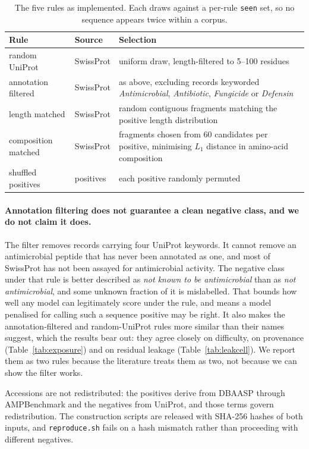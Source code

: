 \documentclass[11pt,a4paper]{article}
\begin{document}
\begin{table}[htbp]\centering\small
\caption{The five rules as implemented. Each draws against a per-rule \texttt{seen} set, so
no sequence appears twice within a corpus.}
\label{tab:negrules}
\begin{tabular}{llp{}}
\toprule
Rule & Source & Selection \\
\midrule
random UniProt      & SwissProt & uniform draw, length-filtered to 5--100 residues \\
annotation filtered & SwissProt & as above, excluding records keyworded
  \textit{Antimicrobial}, \textit{Antibiotic}, \textit{Fungicide} or \textit{Defensin} \\
length matched      & SwissProt & random contiguous fragments matching the positive
  length distribution \\
composition matched & SwissProt & fragments chosen from 60 candidates per positive,
  minimising $L_1$ distance in amino-acid composition \\
shuffled positives  & positives & each positive randomly permuted \\
\bottomrule
\end{tabular}
\end{table}

\paragraph{Annotation filtering does not guarantee a clean negative class, and we do not
claim it does.} The filter removes records carrying four UniProt keywords. It cannot remove
an antimicrobial peptide that has never been annotated as one, and most of SwissProt has
not been assayed for antimicrobial activity. The negative class under that rule is better
described as \emph{not known to be antimicrobial} than as \emph{not antimicrobial}, and
some unknown fraction of it is mislabelled. That bounds how well any model can legitimately
score under the rule, and means a model penalised for calling such a sequence positive may
be right. It also makes the annotation-filtered and random-UniProt rules more similar than
their names suggest, which the results bear out: they agree closely on difficulty, on
provenance (Table~\ref{tab:exposure}) and on residual leakage (Table~\ref{tab:leakcell}).
We report them as two rules because the literature treats them as two, not because we can
show the filter works.

Accessions are not redistributed: the positives derive from DBAASP through AMPBenchmark and
the negatives from UniProt, and those terms govern redistribution. The construction scripts
are released with SHA-256 hashes of both inputs, and \texttt{reproduce.sh} fails on a hash
mismatch rather than proceeding with different negatives.
\end{document}
